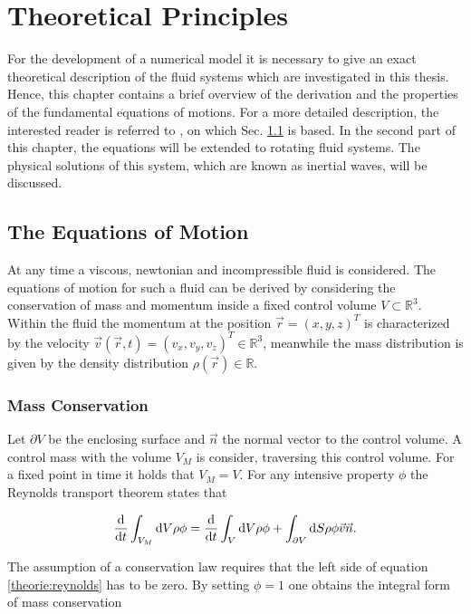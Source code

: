 \chapter{Theoretical Principles}

For the development of a numerical model it is necessary to give an exact theoretical description of the
fluid systems which are investigated in this thesis.
Hence, this chapter contains a brief overview of the derivation and the properties of the fundamental equations of motions.
For a more detailed description, the interested reader is referred to \citep{ferziger99}, on which Sec. \ref{theorie:eqm1} is based.
In the second part of this chapter, the equations will be extended to rotating fluid systems.
The physical solutions of this system, which are known as inertial waves, will be discussed.

\section{The Equations of Motion}\label{theorie:eqm1}

At any time a viscous, newtonian and incompressible fluid is considered. The equations of motion for such a fluid can be derived by considering the conservation of
mass and momentum inside a fixed control volume $V \subset \mathbb{R}^3$.
Within the fluid the momentum at the position $\vec{r} = (x, y, z)^T$  is  characterized by the velocity $\vec{v}(\vec{r}, t) = (v_x, v_y, v_z)^T \in \mathbb{R}^3$,
meanwhile the mass distribution is given by the density distribution $\rho(\vec{r}) \in \mathbb{R}$.

\subsection{Mass Conservation}

Let $\partial V$ be the enclosing surface and $\vec{n}$ the normal vector to the control volume.
A control mass with the volume $V_M$ is consider, traversing this control volume. For a fixed point in time it holds that $V_M = V$.
For any intensive property $\phi$ the Reynolds transport theorem states that

\begin{align}
    \label{theorie:reynolds}
    \frac{\mathop{}\!\mathrm{d}}{\mathop{}\!\mathrm{d} t} \int_{V_M}\mathop{}\!\mathrm{d} V \rho \phi  = \frac{\mathop{}\!\mathrm{d}}{\mathop{}\!\mathrm{d} t}\int_{V} \mathop{}\!\mathrm{d} V \rho \phi + \int_{\partial V}\mathop{}\!\mathrm{d} S \rho \phi \vec{v} \vec{n}.
\end{align}

The assumption of a conservation law requires that the left side of equation \ref{theorie:reynolds} has to be zero.
By setting $\phi = 1$ one obtains the integral form of mass conservation

